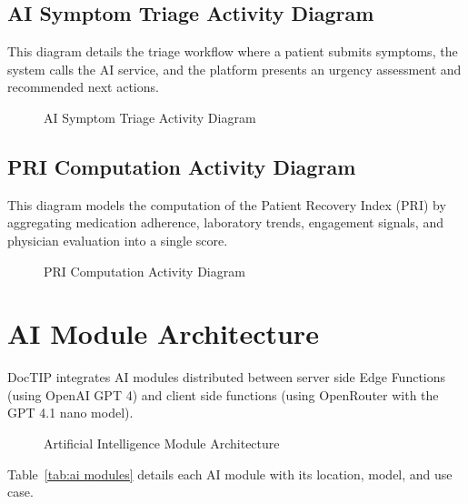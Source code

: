 \documentclass[12pt,a4paper,oneside]{report}
\begin{document}
\subsection{AI Symptom Triage Activity Diagram}

This diagram details the triage workflow where a patient submits symptoms, the system calls the AI service, and the platform presents an urgency assessment and recommended next actions.

\begin{figure}[H]
    \centering
    \resizebox{0.75\textwidth}{!}{}
    \caption{AI Symptom Triage Activity Diagram}
    \label{fig:activity triage}
\end{figure}

\subsection{PRI Computation Activity Diagram}

This diagram models the computation of the Patient Recovery Index (PRI) by aggregating medication adherence, laboratory trends, engagement signals, and physician evaluation into a single score.

\begin{figure}[H]
    \centering
    \resizebox{0.75\textwidth}{!}{}
    \caption{PRI Computation Activity Diagram}
    \label{fig:activity pri}
\end{figure}

\section{AI Module Architecture}

DocTIP integrates AI modules distributed between server side Edge Functions (using OpenAI GPT 4) and client side functions (using OpenRouter with the GPT 4.1 nano model).

\begin{figure}[H]
    \centering
    \resizebox{0.94\textwidth}{!}{}
    \caption{Artificial Intelligence Module Architecture}
    \label{fig:ai architecture}
\end{figure}


Table~\ref{tab:ai modules} details each AI module with its location, model, and use case.
\end{document}
